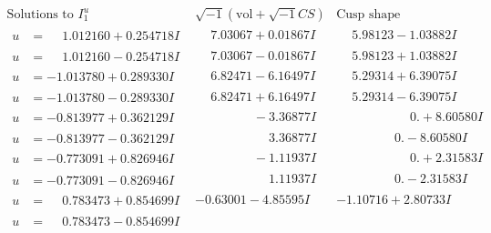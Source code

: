 \documentclass[1p]{elsarticle_modified}
\theoremstyle{definition}
\newcommand{\I}{\sqrt{-1}}
\begin{document}
$$\begin{array}{c|c|c}  
\text{Solutions to }I^u_{1}& \I (\text{vol} + \sqrt{-1}CS) & \text{Cusp shape}\\
 \hline 
\begin{aligned}
u &= \phantom{-}1.012160 + 0.254718 I\end{aligned}
 & \phantom{-}7.03067 + 0.01867 I & \phantom{-}5.98123 - 1.03882 I \\ \hline\begin{aligned}
u &= \phantom{-}1.012160 - 0.254718 I\end{aligned}
 & \phantom{-}7.03067 - 0.01867 I & \phantom{-}5.98123 + 1.03882 I \\ \hline\begin{aligned}
u &= -1.013780 + 0.289330 I\end{aligned}
 & \phantom{-}6.82471 - 6.16497 I & \phantom{-}5.29314 + 6.39075 I \\ \hline\begin{aligned}
u &= -1.013780 - 0.289330 I\end{aligned}
 & \phantom{-}6.82471 + 6.16497 I & \phantom{-}5.29314 - 6.39075 I \\ \hline\begin{aligned}
u &= -0.813977 + 0.362129 I\end{aligned}
 & \phantom{-0.000000 } -3.36877 I & \phantom{-0.000000 -}0. + 8.60580 I \\ \hline\begin{aligned}
u &= -0.813977 - 0.362129 I\end{aligned}
 & \phantom{-0.000000 -}3.36877 I & \phantom{-0.000000 } 0. - 8.60580 I \\ \hline\begin{aligned}
u &= -0.773091 + 0.826946 I\end{aligned}
 & \phantom{-0.000000 } -1.11937 I & \phantom{-0.000000 -}0. + 2.31583 I \\ \hline\begin{aligned}
u &= -0.773091 - 0.826946 I\end{aligned}
 & \phantom{-0.000000 -}1.11937 I & \phantom{-0.000000 } 0. - 2.31583 I \\ \hline\begin{aligned}
u &= \phantom{-}0.783473 + 0.854699 I\end{aligned}
 & -0.63001 - 4.85595 I & -1.10716 + 2.80733 I \\ \hline\begin{aligned}
u &= \phantom{-}0.783473 - 0.854699 I\end{aligned}

\end{array}$$
\end{document}
